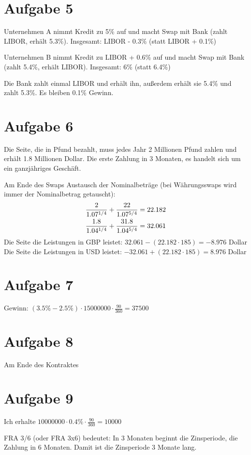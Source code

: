\documentclass{article}
\begin{document}
	\section*{Aufgabe 5}
	Unternehmen A nimmt Kredit zu 5\% auf und macht Swap mit Bank (zahlt LIBOR, erhält 5.3\%). Insgesamt: LIBOR - 0.3\% (statt LIBOR + 0.1\%)
	
	Unternehmen B nimmt Kredit zu LIBOR + 0.6\% auf und macht Swap mit Bank (zahlt 5.4\%, erhält LIBOR). Insgesamt: 6\% (statt 6.4\%)
	
	Die Bank zahlt einmal LIBOR und erhält ihn, außerdem erhält sie 5.4\% und zahlt 5.3\%. Es bleiben 0.1\% Gewinn.
	
	\section*{Aufgabe 6}
	Die Seite, die in Pfund bezahlt, muss jedes Jahr 2 Millionen Pfund zahlen und erhält 1.8 Millionen Dollar. Die erste Zahlung in 3 Monaten, es handelt sich um ein ganzjähriges Geschäft.
	
	Am Ende des Swaps Austausch der Nominalbeträge (bei Währungsswaps wird immer der Nominalbetrag getauscht):
	\begin{align}
		\frac{2}{1.07^{1/4}} + \frac{22}{1.07^{5/4}} &= 22.182 \notag \\
		\frac{1.8}{1.04^{1/4}} + \frac{31.8}{1.04^{5/4}} &= 32.061 \notag
	\end{align}
	Die Seite die Leistungen in GBP leistet: $32.061 - (22.182\cdot 185) = -8.976$ Dollar \\
	Die Seite die Leistungen in USD leistet: $-32.061 + (22.182\cdot 185) = 8.976$ Dollar
	
	\section*{Aufgabe 7}
	Gewinn: $(3.5\% - 2.5\%)\cdot 15000000 \cdot \frac{90}{360} = 37500$
	
	\section*{Aufgabe 8}
	Am Ende des Kontraktes
	
	\section*{Aufgabe 9}
	Ich erhalte $10000000\cdot 0.4\%\cdot\frac{90}{360} = 10000$
	
	FRA 3/6 (oder FRA 3x6) bedeutet: In 3 Monaten beginnt die Zinsperiode, die Zahlung in 6 Monaten. Damit ist die Zinsperiode 3 Monate lang.
	
\end{document}
